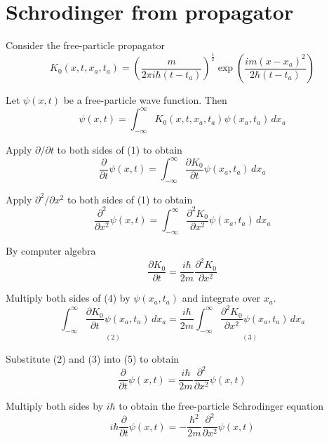

\section*{Schrodinger from propagator}

Consider the free-particle propagator
\begin{equation*}
K_0(x,t,x_a,t_a)=\left(\frac{m}{2\pi i\hbar(t-t_a)}\right)^\frac{1}{2}
\exp\left(\frac{im(x-x_a)^2}{2\hbar(t-t_a)}\right)
\end{equation*}

Let $\psi(x,t)$ be a free-particle wave function.
Then
\begin{equation*}
\psi(x,t)=\int_{-\infty}^\infty K_0(x,t,x_a,t_a)\psi(x_a,t_a)\,dx_a
\tag{1}
\end{equation*}

Apply $\partial/\partial t$ to both sides of (1) to obtain
\begin{equation*}
\frac{\partial}{\partial t}\psi(x,t)
=\int_{-\infty}^\infty\frac{\partial K_0}{\partial t}
\psi(x_a,t_a)\,dx_a
\tag{2}
\end{equation*}

Apply $\partial^2/\partial x^2$ to both sides of (1) to obtain
\begin{equation*}
\frac{\partial^2}{\partial x^2}\psi(x,t)
=\int_{-\infty}^\infty\frac{\partial^2 K_0}{\partial x^2}
\psi(x_a,t_a)\,dx_a
\tag{3}
\end{equation*}

By computer algebra
\begin{equation*}
\frac{\partial K_0}{\partial t}
=\frac{i\hbar}{2m}\frac{\partial^2K_0}{\partial x^2}
\tag{4}
\end{equation*}

Multiply both sides of (4) by $\psi(x_a,t_a)$ and integrate over $x_a$.
\begin{equation*}
\underset{(2)}{\int_{-\infty}^\infty\frac{\partial K_0}{\partial t}\psi(x_a,t_a)\,dx_a}
=\frac{i\hbar}{2m}\underset{(3)}
{\int_{-\infty}^\infty\frac{\partial^2K_0}{\partial x^2}
\psi(x_a,t_a)\,dx_a}
\tag{5}
\end{equation*}

Substitute (2) and (3) into (5) to obtain
\begin{equation*}
\frac{\partial}{\partial t}\psi(x,t)
=\frac{i\hbar}{2m}\frac{\partial^2}{\partial x^2}\psi(x,t)
\end{equation*}

Multiply both sides by $i\hbar$ to obtain the free-particle Schrodinger equation
\begin{equation*}
i\hbar\frac{\partial}{\partial t}\psi(x,t)
=-\frac{\hbar^2}{2m}\frac{\partial^2}{\partial x^2}\psi(x,t)
\end{equation*}



